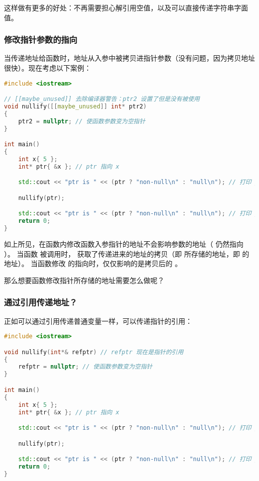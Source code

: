 \documentclass[../../LearnCpp.tex]{subfiles}
\begin{document}
这样做有更多的好处：不再需要担心解引用空值，以及可以直接传递字符串字面值。

\subsubsection*{修改指针参数的指向}

当传递地址给函数时，地址从入参中被拷贝进指针参数（没有问题，因为拷贝地址很快）。现在考虑以下案例：

\begin{lstlisting}[language=C++]
#include <iostream>

// [[maybe_unused]] 去除编译器警告：ptr2 设置了但是没有被使用
void nullify([[maybe_unused]] int* ptr2)
{
    ptr2 = nullptr; // 使函数参数变为空指针
}

int main()
{
    int x{ 5 };
    int* ptr{ &x }; // ptr 指向 x

    std::cout << "ptr is " << (ptr ? "non-null\n" : "null\n"); // 打印 ptr is non-null

    nullify(ptr);

    std::cout << "ptr is " << (ptr ? "non-null\n" : "null\n"); // 打印 ptr is non-null
    return 0;
}
\end{lstlisting}

如上所见，在函数内修改函数入参指针的地址不会影响参数的地址（ 仍然指向 ）。
当函数  被调用时， 获取了传递进来的地址的拷贝（即  所存储的地址，即  的地址）。
当函数修改  的指向时，仅仅影响的是拷贝后的 。

那么想要函数修改指针所存储的地址需要怎么做呢？

\subsubsection*{通过引用传递地址？}

正如可以通过引用传递普通变量一样，可以传递指针的引用：

\begin{lstlisting}[language=C++]
#include <iostream>

void nullify(int*& refptr) // refptr 现在是指针的引用
{
    refptr = nullptr; // 使函数参数变为空指针
}

int main()
{
    int x{ 5 };
    int* ptr{ &x }; // ptr 指向 x

    std::cout << "ptr is " << (ptr ? "non-null\n" : "null\n"); // 打印 ptr is non-null

    nullify(ptr);

    std::cout << "ptr is " << (ptr ? "non-null\n" : "null\n"); // 打印 ptr is null
    return 0;
}
\end{lstlisting}
\end{document}
